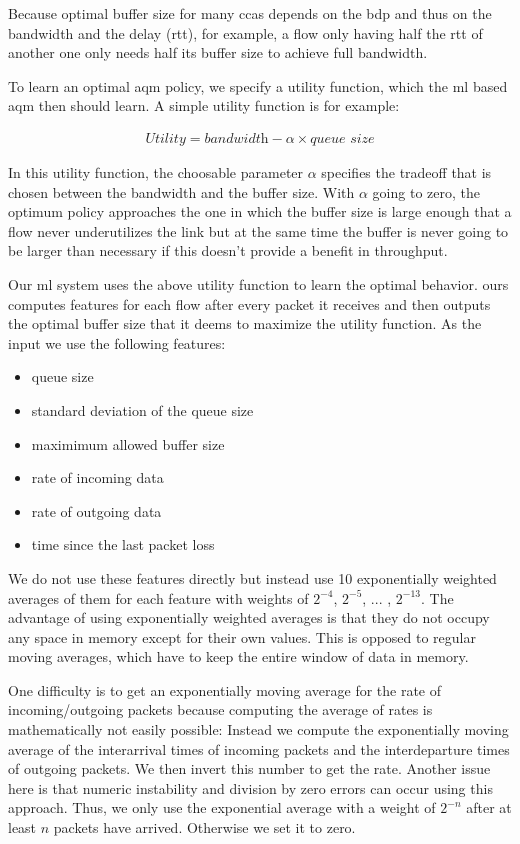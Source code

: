 \documentclass[conference]{IEEEtran}
\begin{document}
Because optimal buffer size for many \glspl{cca} depends on the \gls{bdp} and thus on the bandwidth and the delay (\gls{rtt}), for example, a flow only having half the \gls{rtt} of another one only needs half its buffer size to achieve full bandwidth. 

To learn an optimal \gls{aqm} policy, we specify a utility function, which the \gls{ml} based \gls{aqm} then should learn. A simple utility function is for example:

\begin{align}
\textit{Utility} = \textit{bandwidth}-\alpha\times\textit{queue size}
\end{align}

In this utility function, the choosable parameter $\alpha$ specifies the tradeoff that is chosen between the bandwidth and the buffer size. With $\alpha$ going to zero, the optimum policy approaches the one in which the buffer size is large enough that a flow never underutilizes the link but at the same time the buffer is never going to be larger than necessary if this doesn't provide a benefit in throughput. 

Our \gls{ml} system uses the above utility function to learn the optimal behavior. \gls{ours} computes features for each flow after every packet it receives and then outputs the optimal buffer size that it deems to maximize the utility function. As the input we use the following features: 
\begin{itemize}
\item queue size
\item standard deviation of the queue size 
\item maximimum allowed buffer size
\item rate of incoming data
\item rate of outgoing data
\item time since the last packet loss
\end{itemize}
We do not use these features directly but instead use 10 exponentially weighted averages of them for each feature with weights of $2^{-4}$, $2^{-5}$, ... , $2^{-13}$. The advantage of using exponentially weighted averages is that they do not occupy any space in memory except for their own values. This is opposed to regular moving averages, which have to keep the entire window of data in memory. 

One difficulty is to get an exponentially moving average for the rate of incoming/outgoing packets because computing the average of rates is mathematically not easily possible: Instead we compute the exponentially moving average of the interarrival times of incoming packets and the interdeparture times of outgoing packets. We then invert this number to get the rate. Another issue here is that numeric instability and division by zero errors can occur using this approach. Thus, we only use the exponential average with a weight of $2^{-n}$ after at least $n$ packets have arrived. Otherwise we set it to zero. 
\end{document}
